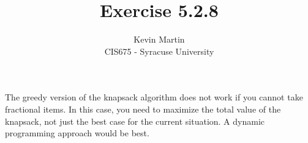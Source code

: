 \documentclass{article}
\author{Kevin Martin\\ CIS675 - Syracuse University}
\title{Exercise 5.2.8}
\begin{document}
\maketitle
The greedy version of the knapsack algorithm does not work if you
cannot take fractional items. In this case, you need to maximize
the total value of the knapsack, not just the best case for the 
current situation. A dynamic programming approach would be best.
\end{document}
